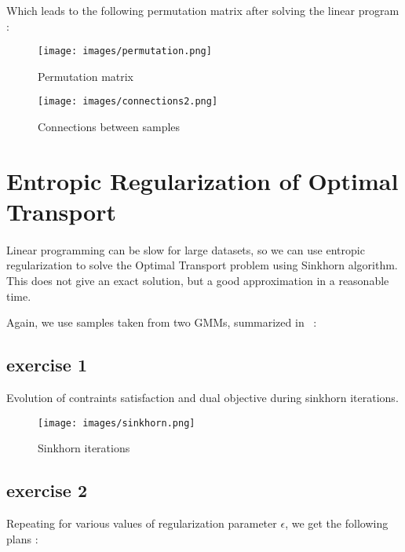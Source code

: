 \documentclass[a4paper,11pt]{article}
\newcommand{\1}{\mathbbm{1}}
\begin{document}
Which leads to the following permutation matrix after solving the linear program :

\begin{figure}[H]
    \centering
    \texttt{[image: images/permutation.png]}
    \caption{Permutation matrix}
    \label{fig:permutation}
\end{figure}

\begin{figure}[H]
    \centering
    \texttt{[image: images/connections2.png]}
    \caption{Connections between samples}
    \label{fig:connections2}
\end{figure}

\section{Entropic Regularization of Optimal Transport}

\paragraph{} Linear programming can be slow for large datasets, so we can use entropic regularization to solve the Optimal Transport problem using Sinkhorn algorithm. This does not give an exact solution, but a good approximation in a reasonable time.

Again, we use samples taken from two GMMs, summarized in ~:

\subsection{exercise 1}

Evolution of contraints satisfaction and dual objective during sinkhorn iterations.

\begin{figure}[H]
    \centering
    \texttt{[image: images/sinkhorn.png]}
    \caption{Sinkhorn iterations}
    \label{fig:sinkhorn}
\end{figure}

\subsection{exercise 2}

Repeating for various values of regularization parameter $\epsilon$, we get the following plans :
\end{document}
